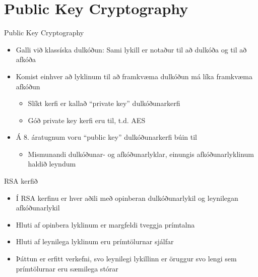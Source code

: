 \documentclass[handout]{beamer}
\begin{document}
\section{Public Key Cryptography}

\begin{frame}{Public Key Cryptography}
\begin{itemize}
 \item Galli við klassíska dulkóðun: Sami lykill er notaður til að dulkóða og til að afkóða
 \item Komist einhver að lyklinum til að framkvæma dulkóðun má líka framkvæma afkóðun
 \begin{itemize}
  \item Slíkt kerfi er kallað ``private key'' dulkóðunarkerfi
  \item Góð private key kerfi eru til, t.d. AES
 \end{itemize}
 \item Á 8. áratugnum voru ``public key'' dulkóðunarkerfi búin til
 \begin{itemize}
  \item Mismunandi dulkóðunar- og afkóðunarlyklar, einungis afkóðunarlyklinum haldið leyndum
 \end{itemize}
\end{itemize}
\end{frame}

\begin{frame}{RSA kerfið}
\begin{itemize}
 \item Í RSA kerfinu er hver aðili með opinberan dulkóðunarlykil og leynilegan afkóðunarlykil
 \item Hluti af opinbera lyklinum er margfeldi tveggja prímtalna
 \item Hluti af leynilega lyklinum eru prímtölurnar sjálfar
 \item Þáttun er erfitt verkefni, svo leynilegi lykillinn er öruggur svo lengi sem prímtölurnar eru sæmilega stórar
\end{itemize}
\end{frame}
\end{document}
